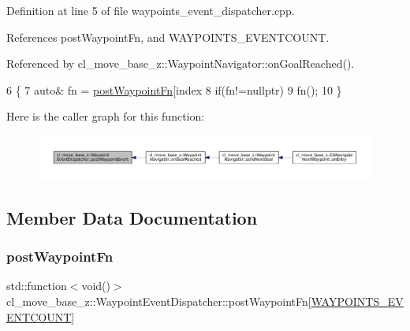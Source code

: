 Definition at line 5 of file waypoints\+\_\+event\+\_\+dispatcher.\+cpp.



References post\+Waypoint\+Fn, and W\+A\+Y\+P\+O\+I\+N\+T\+S\+\_\+\+E\+V\+E\+N\+T\+C\+O\+U\+NT.



Referenced by cl\+\_\+move\+\_\+base\+\_\+z\+::\+Waypoint\+Navigator\+::on\+Goal\+Reached().


\begin{DoxyCode}
6 \{
7     \textcolor{keyword}{auto}& fn = \hyperlink{classcl__move__base__z_1_1WaypointEventDispatcher_a964a57fcce5d48ec60243230722d8dd7}{postWaypointFn}[index %
8     \textcolor{keywordflow}{if}(fn!=\textcolor{keyword}{nullptr})
9         fn();
10 \}
\end{DoxyCode}
Here is the caller graph for this function\+:
\nopagebreak
\begin{figure}[H]
\begin{center}
\leavevmode
\includegraphics[width=350pt]{classcl__move__base__z_1_1WaypointEventDispatcher_a6462eae610b97df2207ecd93c1544aaf_icgraph}
\end{center}
\end{figure}


\subsection{Member Data Documentation}
\mbox{\label{classcl__move__base__z_1_1WaypointEventDispatcher_a964a57fcce5d48ec60243230722d8dd7}} 
\subsubsection{\texorpdfstring{post\+Waypoint\+Fn}{postWaypointFn}}
{\footnotesize\ttfamily std\+::function$<$void()$>$ cl\+\_\+move\+\_\+base\+\_\+z\+::\+Waypoint\+Event\+Dispatcher\+::post\+Waypoint\+Fn\mbox{[}\hyperlink{waypoints__event__dispatcher_8h_add4ce0c5d955be6047a4820c63e7df08}{W\+A\+Y\+P\+O\+I\+N\+T\+S\+\_\+\+E\+V\+E\+N\+T\+C\+O\+U\+NT}\mbox{]}\hspace{0.3cm}{\ttfamily [private]}}



